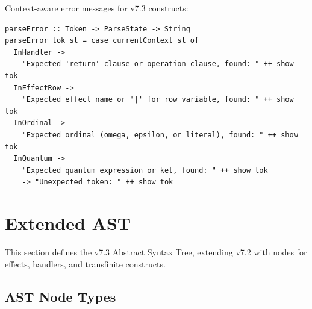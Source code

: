 \begin{definition}
\label{def:error-messages}
Context-aware error messages for v7.3 constructs:
\begin{verbatim}
parseError :: Token -> ParseState -> String
parseError tok st = case currentContext st of
  InHandler ->
    "Expected 'return' clause or operation clause, found: " ++ show tok
  InEffectRow ->
    "Expected effect name or '|' for row variable, found: " ++ show tok
  InOrdinal ->
    "Expected ordinal (omega, epsilon, or literal), found: " ++ show tok
  InQuantum ->
    "Expected quantum expression or ket, found: " ++ show tok
  _ -> "Unexpected token: " ++ show tok
\end{verbatim}
\end{definition}

\section{Extended AST}
\label{sec:extended-ast}

This section defines the v7.3 Abstract Syntax Tree, extending v7.2 with nodes for effects, handlers, and transfinite constructs.

\subsection{AST Node Types}
\label{subsec:ast-nodes}

